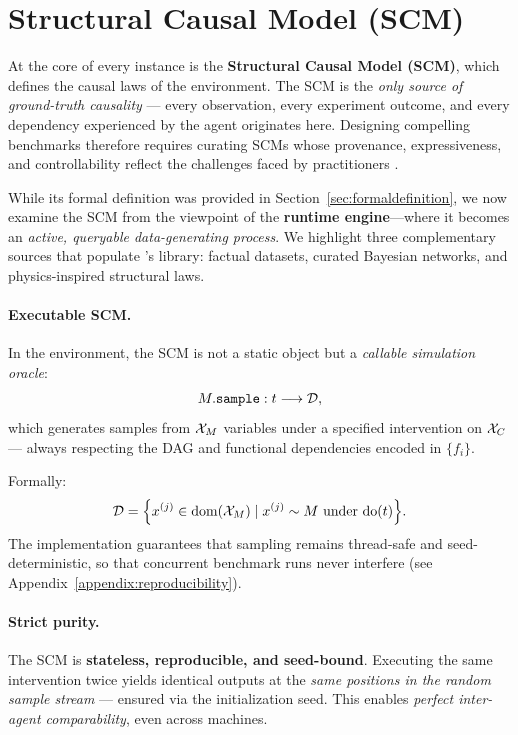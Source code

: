 \section{Structural Causal Model (SCM)}
At the core of every \game instance is the \textbf{Structural Causal Model (SCM)}, which defines the causal laws of the environment.  
The SCM is the \emph{only source of ground-truth causality} — every observation, every experiment outcome, and every dependency experienced by the agent originates here. Designing compelling benchmarks therefore requires curating SCMs whose provenance, expressiveness, and controllability reflect the challenges faced by practitioners \citep{pearl2009causality,reisach2021beware}.

While its formal definition was provided in Section~\ref{sec:formaldefinition}, we now examine the SCM from the viewpoint of the \textbf{runtime engine}—where it becomes an \emph{active, queryable data-generating process}. We highlight three complementary sources that populate \package’s library: factual datasets, curated Bayesian networks, and physics-inspired structural laws.

\paragraph{Executable SCM.}
In the environment, the SCM is not a static object but a \emph{callable simulation oracle}:
\[
    M.\texttt{sample} : t \longrightarrow \mathcal{D},
\]
which generates samples from $\mathcal{X}_M$ variables under a specified intervention on $\mathcal{X}_C$ — always respecting the DAG and functional dependencies encoded in $\{f_i\}$.

Formally:
\[
    \mathcal{D} = \Big\{ x^{(j)} \in \mathrm{dom}(\mathcal{X}_M) \;|\; x^{(j)} \sim M \text{ under do}(t) \Big\}.
\]
The implementation guarantees that sampling remains thread-safe and seed-deterministic, so that concurrent benchmark runs never interfere (see Appendix~\ref{appendix:reproducibility}).

\paragraph{Strict purity.}
The SCM is \textbf{stateless, reproducible, and seed-bound}.  
Executing the same intervention twice yields identical outputs at the \emph{same positions in the random sample stream} — ensured via the initialization seed.  
This enables \emph{perfect inter-agent comparability}, even across machines.

